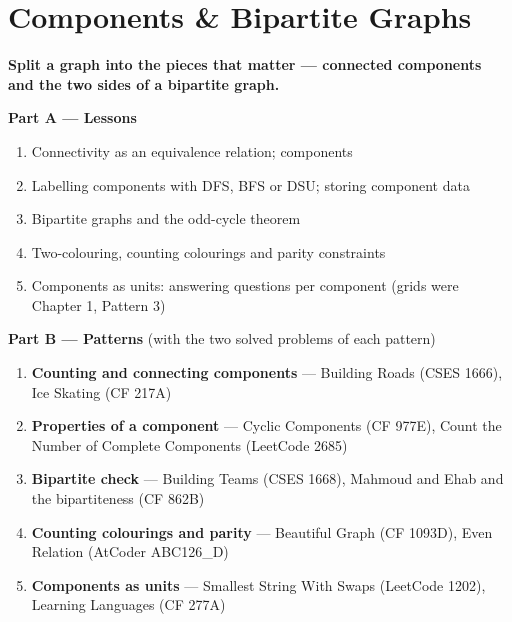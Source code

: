 \chapter{Components \& Bipartite Graphs}
\label{ch:components}

\begin{tcolorbox}[enhanced, colback=white, colframe=secondaryblue, boxrule=1pt, arc=2mm]
\textbf{\large\textcolor{primaryblue}{Split a graph into the pieces that matter --- connected components and the two sides of a bipartite graph.}}
\end{tcolorbox}


\begin{plannedbox}
\textbf{Part A --- Lessons}
\begin{enumerate}[leftmargin=*, label=\textbf{A\arabic*.}, itemsep=1pt]
    \item Connectivity as an equivalence relation; components
    \item Labelling components with DFS, BFS or DSU; storing component data
    \item Bipartite graphs and the odd-cycle theorem
    \item Two-colouring, counting colourings and parity constraints
    \item Components as units: answering questions per component (grids were Chapter 1, Pattern 3)
\end{enumerate}
\textbf{Part B --- Patterns} (with the two solved problems of each pattern)
\begin{enumerate}[leftmargin=*, label=\textbf{P\arabic*.}, itemsep=1pt]
    \item \textbf{Counting and connecting components} --- Building Roads {\small\color{darkgray}(CSES 1666)}, Ice Skating {\small\color{darkgray}(CF 217A)}
    \item \textbf{Properties of a component} --- Cyclic Components {\small\color{darkgray}(CF 977E)}, Count the Number of Complete Components {\small\color{darkgray}(LeetCode 2685)}
    \item \textbf{Bipartite check} --- Building Teams {\small\color{darkgray}(CSES 1668)}, Mahmoud and Ehab and the bipartiteness {\small\color{darkgray}(CF 862B)}
    \item \textbf{Counting colourings and parity} --- Beautiful Graph {\small\color{darkgray}(CF 1093D)}, Even Relation {\small\color{darkgray}(AtCoder ABC126\_D)}
    \item \textbf{Components as units} --- Smallest String With Swaps {\small\color{darkgray}(LeetCode 1202)}, Learning Languages {\small\color{darkgray}(CF 277A)}
\end{enumerate}
\end{plannedbox}
